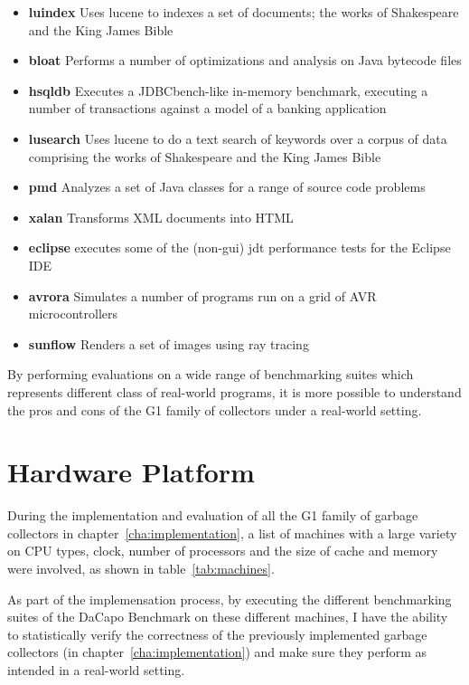 \begin{itemize}
  \item \textbf{luindex} Uses lucene to indexes a set of documents; the works of Shakespeare and the King James Bible
  \item \textbf{bloat} Performs a number of optimizations and analysis on Java bytecode files
  \item \textbf{hsqldb} Executes a JDBCbench-like in-memory benchmark, executing a number of transactions against a model of a banking application
  \item \textbf{lusearch} Uses lucene to do a text search of keywords over a corpus of data comprising the works of Shakespeare and the King James Bible
  \item \textbf{pmd} Analyzes a set of Java classes for a range of source code problems
  \item \textbf{xalan} Transforms XML documents into HTML
  \item \textbf{eclipse} executes some of the (non-gui) jdt performance tests for the Eclipse IDE
  \item \textbf{avrora} Simulates a number of programs run on a grid of AVR microcontrollers
  \item \textbf{sunflow} Renders a set of images using ray tracing
\end{itemize}

By performing evaluations on a wide range of benchmarking suites which represents different
class of real-world programs, it is more possible to understand the pros and cons
of the G1 family of collectors under a real-world setting.

\section{Hardware Platform} %
\label{sec:hardware}

During the implementation and evaluation of all the G1 family of garbage collectors in chapter~\ref{cha:implementation},
a list of machines with a large variety on CPU types, clock, number of processors and
the size of cache and memory were involved, as shown in table~\ref{tab:machines}.

As part of the implemensation process,
by executing the different benchmarking suites of the DaCapo Benchmark on these different machines,
I have the ability to statistically verify the correctness of the previously
implemented garbage collectors (in chapter~\ref{cha:implementation})
and make sure they perform as intended in a real-world setting.

